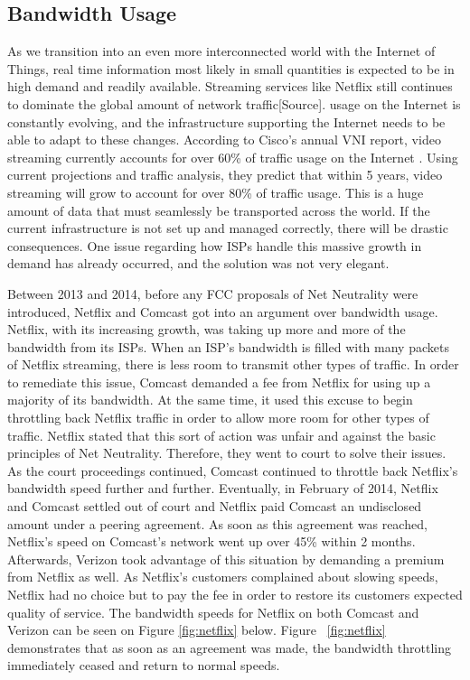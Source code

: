 \documentclass{sigcomm-alternate}
\begin{document}
\subsection{Bandwidth Usage}
As we transition into an even more interconnected world with the Internet of Things, real time information most likely in small quantities is expected to be in high demand and readily available. Streaming services like Netflix still continues to dominate the global amount of network traffic[Source]. usage on the Internet is constantly evolving, and the infrastructure supporting the Internet needs to be able to adapt to these changes. According to Cisco’s annual VNI report, video streaming currently accounts for over 60\% of traffic usage on the Internet \cite{cisco}. Using current projections and traffic analysis, they predict that within 5 years, video streaming will grow to account for over 80\% of traffic usage. This is a huge amount of data that must seamlessly be transported across the world. If the current infrastructure is not set up and managed correctly, there will be drastic consequences. One issue regarding how ISPs handle this massive growth in demand has already occurred, and the solution was not very elegant.

Between 2013 and 2014, before any FCC proposals of Net Neutrality were introduced, Netflix and Comcast got into an argument over bandwidth usage. Netflix, with its increasing growth, was taking up more and more of the bandwidth from its ISPs. When an ISP’s bandwidth is filled with many packets of Netflix streaming, there is less room to transmit other types of traffic. In order to remediate this issue, Comcast demanded a fee from Netflix for using up a majority of its bandwidth. At the same time, it used this excuse to begin throttling back Netflix traffic in order to allow more room for other types of traffic. Netflix stated that this sort of action was unfair and against the basic principles of Net Neutrality. Therefore, they went to court to solve their issues. As the court proceedings continued, Comcast continued to throttle back Netflix’s bandwidth speed further and further. Eventually, in February of 2014, Netflix and Comcast settled out of court and Netflix paid Comcast an undisclosed amount under a peering agreement. As soon as this agreement was reached, Netflix’s speed on Comcast’s network went up over 45\% within 2 months. Afterwards, Verizon took advantage of this situation by demanding a premium from Netflix as well. As Netflix’s customers complained about slowing speeds, Netflix had no choice but to pay the fee in order to restore its customers expected quality of service. The bandwidth speeds for Netflix on both Comcast and Verizon can be seen on Figure \ref{fig:netflix} below. Figure ~\ref{fig:netflix} demonstrates that as soon as an agreement was made, the bandwidth throttling immediately ceased and return to normal speeds.
\end{document}
